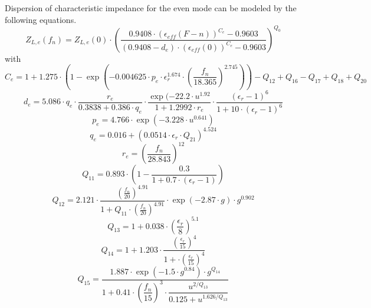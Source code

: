 \documentclass[10pt]{report}
\begin{document}
Dispersion of characteristic impedance for the even mode can be
modeled by the following equations.
\begin{equation}
Z_{L,e}(f_n) = Z_{L,e}(0)\cdot \left( \frac{0.9408\cdot (\epsilon_{eff}(F-n))^{C_e} - 0.9603}
                        {(0.9408-d_e)\cdot (\epsilon_{eff}(0))^{C_e} - 0.9603} \right) ^{Q_0}
\end{equation}
with
\begin{equation}
C_e = 1 + 1.275\cdot \left( 1-\exp\left( -0.004625\cdot p_e\cdot \epsilon_r^{1.674}\cdot
      \left( \frac{f_n}{18.365} \right) ^{2.745} \right) \right) - Q_{12}+Q_{16}-Q_{17}+Q_{18}+Q_{20}
\end{equation}
\begin{equation}
d_e = 5.086\cdot q_e\cdot\frac{r_e}{0.3838+0.386\cdot q_e}\cdot
      \frac{\exp(-22.2\cdot u^{1.92}}{1+1.2992\cdot r_e}\cdot
      \frac{(\epsilon_r-1)^6}{1 + 10\cdot (\epsilon_r-1)^6}
\end{equation}
\begin{equation}
p_e = 4.766\cdot \exp (-3.228\cdot u^{0.641})
\end{equation}
\begin{equation}
q_e = 0.016 + (0.0514\cdot \epsilon_r\cdot Q_{21})^{4.524}
\end{equation}
\begin{equation}
r_e = \left( \frac{f_n}{28.843} \right) ^{12}
\end{equation}
\begin{equation}
Q_{11} = 0.893\cdot \left( 1 - \frac{0.3}{1+0.7\cdot(\epsilon_r-1)} \right)
\end{equation}
\begin{equation}
Q_{12} = 2.121\cdot \frac{\left( \frac{f_n}{20}\right) ^{4.91}}
                         {1+Q_{11}\cdot\left( \frac{f_n}{20}\right) ^{4.91}}
	      \cdot \exp(-2.87\cdot g)\cdot g^{0.902}
\end{equation}
\begin{equation}
Q_{13} = 1 + 0.038\cdot \left( \frac{\epsilon_r}{8} \right) ^{5.1}
\end{equation}
\begin{equation}
Q_{14} = 1 + 1.203\cdot \frac{ \left( \frac{\epsilon_r}{15} \right) ^4}
                             {1 + \cdot \left( \frac{\epsilon_r}{15} \right) ^4}
\end{equation}
\begin{equation}
Q_{15} = \dfrac{ 1.887\cdot \exp(-1.5\cdot g^{0.84})\cdot g^{Q_{14}} }
              { 1 + 0.41\cdot \left( \dfrac{f_n}{15} \right) ^3 \cdot
	        \dfrac{u^{2/Q_{13}}}{0.125 + u^{1.626/Q_{13}}}}
\end{equation}
\end{document}
